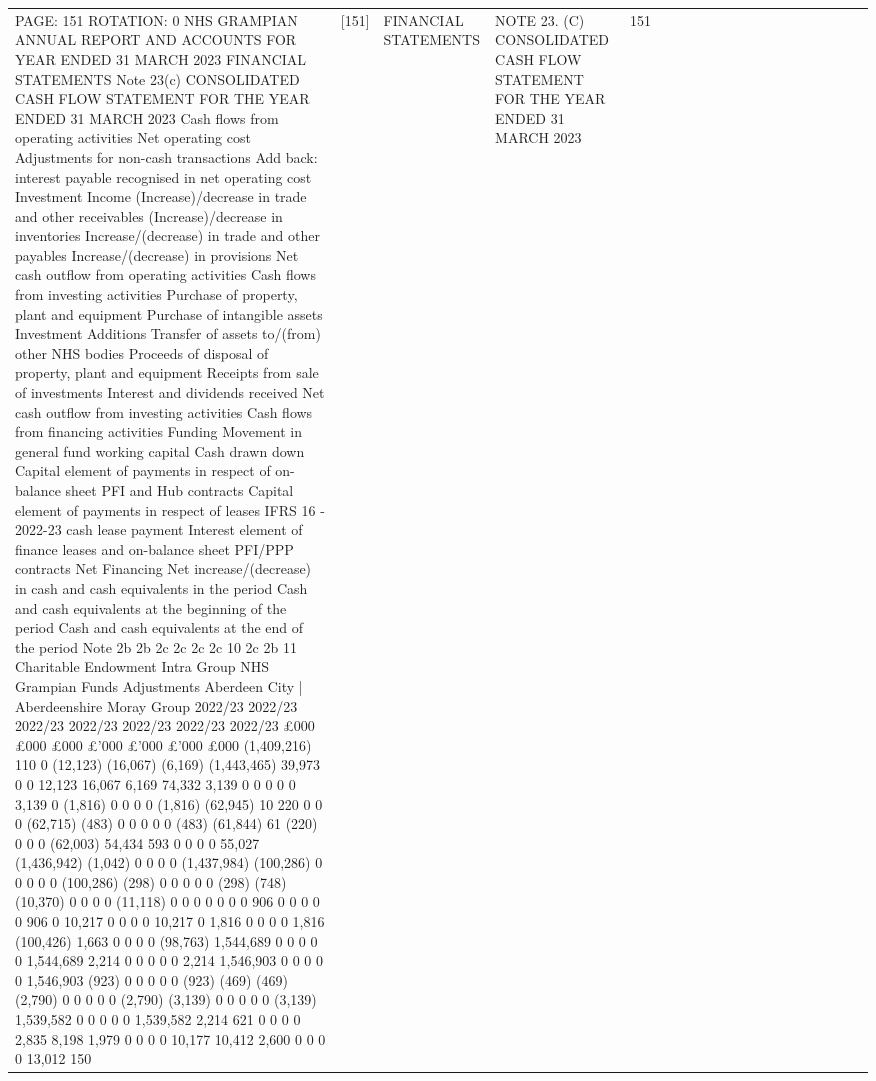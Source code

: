 \begin{tabular}{lllllllllrlllllllllr}
PAGE: 151
ROTATION: 0
NHS GRAMPIAN
ANNUAL REPORT AND ACCOUNTS FOR YEAR ENDED 31 MARCH 2023
FINANCIAL STATEMENTS
Note 23(c) CONSOLIDATED CASH FLOW STATEMENT FOR THE YEAR ENDED 31 MARCH 2023
Cash flows from operating activities
Net operating cost
Adjustments for non-cash transactions
Add back: interest payable recognised in net operating cost
Investment Income
(Increase)/decrease in trade and other receivables
(Increase)/decrease in inventories
Increase/(decrease) in trade and other payables
Increase/(decrease) in provisions
Net cash outflow from operating activities
Cash flows from investing activities
Purchase of property, plant and equipment
Purchase of intangible assets
Investment Additions
Transfer of assets to/(from) other NHS bodies
Proceeds of disposal of property, plant and equipment
Receipts from sale of investments
Interest and dividends received
Net cash outflow from investing activities
Cash flows from financing activities
Funding
Movement in general fund working capital
Cash drawn down
Capital element of payments in respect of on-balance sheet PFI and Hub
contracts
Capital element of payments in respect of leases
IFRS 16 - 2022-23 cash lease payment
Interest element of finance leases and on-balance sheet PFI/PPP contracts
Net Financing
Net increase/(decrease) in cash and cash equivalents in the period
Cash and cash equivalents at the beginning of the period
Cash and cash equivalents at the end of the period
Note
2b
2b
2c
2c
2c
2c
10
2c
2b
11
Charitable
Endowment Intra Group
NHS Grampian Funds Adjustments Aberdeen City | Aberdeenshire Moray Group
2022/23 2022/23 2022/23 2022/23 2022/23 2022/23 2022/23
£000 £000 £000 £'000 £'000 £'000 £000
(1,409,216) 110 0 (12,123) (16,067) (6,169) (1,443,465)
39,973 0 0 12,123 16,067 6,169 74,332
3,139 0 0 0 0 0 3,139
0 (1,816) 0 0 0 0 (1,816)
(62,945) 10 220 0 0 0 (62,715)
(483) 0 0 0 0 0 (483)
(61,844) 61 (220) 0 0 0 (62,003)
54,434 593 0 0 0 0 55,027
(1,436,942) (1,042) 0 0 0 0 (1,437,984)
(100,286) 0 0 0 0 0 (100,286)
(298) 0 0 0 0 0 (298)
(748) (10,370) 0 0 0 0 (11,118)
0 0 0 0 0 0 0
906 0 0 0 0 0 906
0 10,217 0 0 0 0 10,217
0 1,816 0 0 0 0 1,816
(100,426) 1,663 0 0 0 0 (98,763)
1,544,689 0 0 0 0 0 1,544,689
2,214 0 0 0 0 0 2,214
1,546,903 0 0 0 0 0 1,546,903
(923) 0 0 0 0 0 (923)
(469) (469)
(2,790) 0 0 0 0 0 (2,790)
(3,139) 0 0 0 0 0 (3,139)
1,539,582 0 0 0 0 0 1,539,582
2,214 621 0 0 0 0 2,835
8,198 1,979 0 0 0 0 10,177
10,412 2,600 0 0 0 0 13,012
150 & [151] & FINANCIAL STATEMENTS & NOTE 23. (C) CONSOLIDATED CASH FLOW STATEMENT FOR THE YEAR ENDED 31 MARCH 2023 & 151 \\

\end{tabular}
